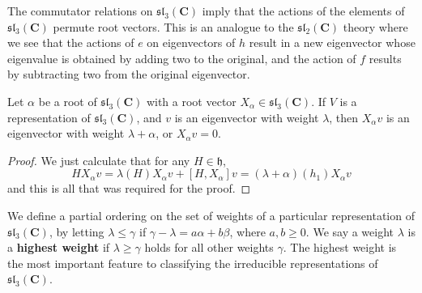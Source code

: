 The commutator relations on $\mathfrak{sl}_3(\mathbf{C})$ imply that the actions of the elements of $\mathfrak{sl}_3(\mathbf{C})$ permute root vectors. This is an analogue to the $\mathfrak{sl}_2(\mathbf{C})$ theory where we see that the actions of $e$ on eigenvectors of $h$ result in a new eigenvector whose eigenvalue is obtained by adding two to the original, and the action of $f$ results by subtracting two from the original eigenvector.

\begin{lemma}
    Let $\alpha$ be a root of $\mathfrak{sl}_3(\mathbf{C})$ with a root vector $X_\alpha \in \mathfrak{sl}_3(\mathbf{C})$. If $V$ is a representation of $\mathfrak{sl}_3(\mathbf{C})$, and $v$ is an eigenvector with weight $\lambda$, then $X_\alpha v$ is an eigenvector with weight $\lambda + \alpha$, or $X_\alpha v = 0$.
\end{lemma}
\begin{proof}
    We just calculate that for any $H \in \mathfrak{h}$,
    \[ H X_\alpha v = \lambda(H) X_\alpha v + [H, X_\alpha] v = (\lambda + \alpha)(h_1) X_\alpha v \]
    and this is all that was required for the proof.
\end{proof}

We define a partial ordering on the set of weights of a particular representation of $\mathfrak{sl}_3(\mathbf{C})$, by letting $\lambda \leq \gamma$ if $\gamma - \lambda = a \alpha + b \beta$, where $a,b \geq 0$. We say a weight $\lambda$ is a {\bf highest weight} if $\lambda \geq \gamma$ holds for all other weights $\gamma$. The highest weight is the most important feature to classifying the irreducible representations of $\mathfrak{sl}_3(\mathbf{C})$.

